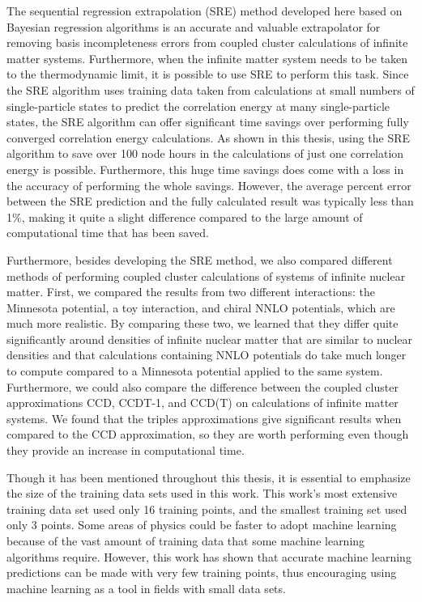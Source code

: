 
The sequential regression extrapolation (SRE) method developed here based on Bayesian regression algorithms is an accurate and valuable extrapolator for removing basis incompleteness errors from coupled cluster calculations of infinite matter systems. Furthermore, when the infinite matter system needs to be taken to the thermodynamic limit, it is possible to use SRE to perform this task. Since the SRE algorithm uses training data taken from calculations at small numbers of single-particle states to predict the correlation energy at many single-particle states, the SRE algorithm can offer significant time savings over performing fully converged correlation energy calculations. As shown in this thesis, using the SRE algorithm to save over 100 node hours in the calculations of just one correlation energy is possible. Furthermore, this huge time savings does come with a loss in the accuracy of performing the whole savings. However, the average percent error between the SRE prediction and the fully calculated result was typically less than 1$\%$, making it quite a slight difference compared to the large amount of computational time that has been saved.

Furthermore, besides developing the SRE method, we also compared different methods of performing coupled cluster calculations of systems of infinite nuclear matter. First, we compared the results from two different interactions: the Minnesota potential, a toy interaction, and chiral NNLO potentials, which are much more realistic. By comparing these two, we learned that they differ quite significantly around densities of infinite nuclear matter that are similar to nuclear densities and that calculations containing NNLO potentials do take much longer to compute compared to a Minnesota potential applied to the same system. Furthermore, we could also compare the difference between the coupled cluster approximations CCD, CCDT-1, and CCD(T) on calculations of infinite matter systems. We found that the triples approximations give significant results when compared to the CCD approximation, so they are worth performing even though they provide an increase in computational time.

Though it has been mentioned throughout this thesis, it is essential to emphasize the size of the training data sets used in this work. This work's most extensive training data set used only 16 training points, and the smallest training set used only 3 points. Some areas of physics could be faster to adopt machine learning because of the vast amount of training data that some machine learning algorithms require. However, this work has shown that accurate machine learning predictions can be made with very few training points, thus encouraging using machine learning as a tool in fields with small data sets.

